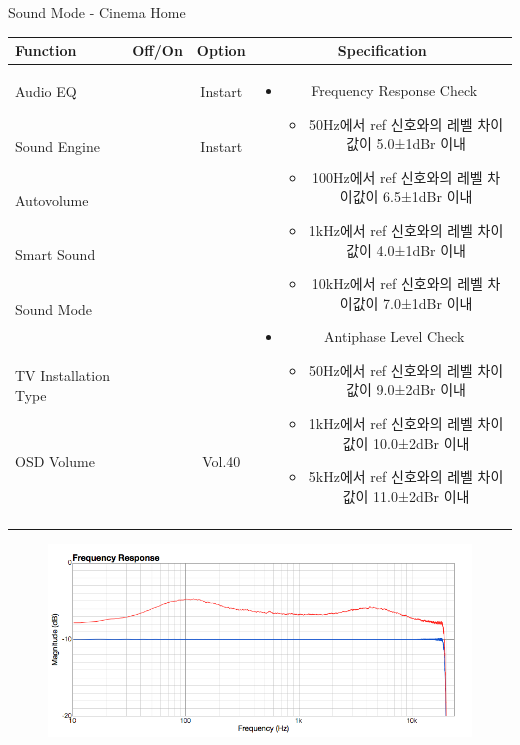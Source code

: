 \begin{frame}[t]{Sound Mode - Cinema Home}
\begin{tiny}
\begin{tabular}{@{}lccc@{}}
\toprule
Function & Off/On & Option & Specification \\
\midrule
Audio EQ & \color{black}{Off} & Instart &
\multirow{10}{60mm}{
\begin{itemize}
\item Frequency Response Check
	\begin{itemize}
	\item 50Hz에서 ref 신호와의 레벨 차이값이 5.0±1dBr 이내
	\item 100Hz에서 ref 신호와의 레벨 차이값이 6.5±1dBr 이내
	\item 1kHz에서 ref 신호와의 레벨 차이값이 4.0±1dBr 이내
	\item 10kHz에서 ref 신호와의 레벨 차이값이 7.0±1dBr 이내
	\end{itemize}
\item Antiphase Level Check
	\begin{itemize}
	\item 50Hz에서 ref 신호와의 레벨 차이값이 9.0±2dBr 이내
	\item 1kHz에서 ref 신호와의 레벨 차이값이 10.0±2dBr 이내
	\item 5kHz에서 ref 신호와의 레벨 차이값이 11.0±2dBr 이내
	\end{itemize}
\end{itemize}
} \\
Sound Engine & \color{blue}{On} & Instart & \\
Autovolume & \color{black}{Off} & & \\
Smart Sound & \color{black}{Off} & & \\
Sound Mode & \color{blue}{On} & \color{blue}{Cinema} & \\
TV Installation Type & \color{blue}{On} & \color{black}{Standtype1} & \\
OSD Volume & \color{blue}{On} & Vol.40 & \\
& & & \\
& & & \\
& & & \\
& & & \\
\midrule
\end{tabular}
\end{tiny}

\begin{figure}[b]
\includegraphics[height=0.4\textwidth]{figures/cinema.png}
\end{figure}

\end{frame}